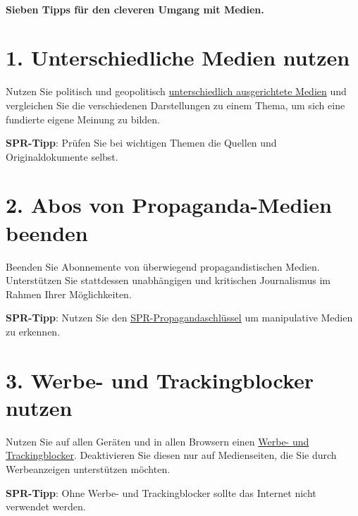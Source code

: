 \hypertarget{sieben-tipps-fuxfcr-den-cleveren-umgang-mit-medien}{%
\paragraph{Sieben Tipps für den cleveren Umgang mit
Medien.}\label{sieben-tipps-fuxfcr-den-cleveren-umgang-mit-medien}}

\hypertarget{1-unterschiedliche-medien-nutzen}{%
\section{1. Unterschiedliche Medien
nutzen}\label{1-unterschiedliche-medien-nutzen}}

Nutzen Sie politisch und geopolitisch
\href{https://swprs.org/medien-navigator/}{unterschiedlich ausgerichtete
Medien} und vergleichen Sie die verschiedenen Darstellungen zu einem
Thema, um sich eine fundierte eigene Meinung zu bilden.

\textbf{SPR-Tipp}: Prüfen Sie bei wichtigen Themen die Quellen und
Originaldokumente selbst.

\hypertarget{2-abos-von-propaganda-medien-beenden}{%
\section{2. Abos von Propaganda-Medien
beenden}\label{2-abos-von-propaganda-medien-beenden}}

Beenden Sie Abonnemente von überwiegend propagandistischen Medien.
Unterstützen Sie stattdessen unabhängigen und kritischen Journalismus im
Rahmen Ihrer Möglichkeiten.

\textbf{SPR-Tipp}: Nutzen Sie den
\href{https://swprs.org/der-propaganda-schluessel/}{SPR-Propagandaschlüssel}
um manipulative Medien zu erkennen.

\hypertarget{3-werbe--und-trackingblocker-nutzen}{%
\section{3. Werbe- und Trackingblocker
nutzen}\label{3-werbe--und-trackingblocker-nutzen}}

Nutzen Sie auf allen Geräten und in allen Browsern einen
\href{https://thinkmobiles.com/blog/best-adblockers/}{Werbe- und
Trackingblocker}. Deaktivieren Sie diesen nur auf Medienseiten, die Sie
durch Werbeanzeigen unterstützen möchten.

\textbf{SPR-Tipp}: Ohne Werbe- und Trackingblocker sollte das Internet
nicht verwendet werden.

